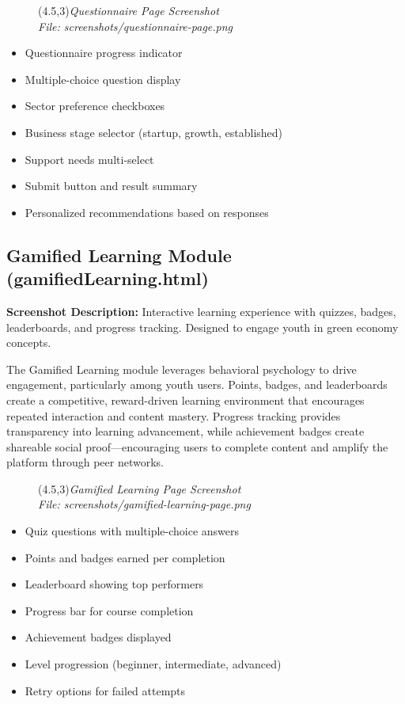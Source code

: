 \documentclass[a4paper,12pt]{article}
\begin{document}
\begin{figure}[h]
    \centering
    \framebox(4.5,3){\textit{Questionnaire Page Screenshot}}\\
    \small\textit{File: screenshots/questionnaire-page.png}
\end{figure}

\begin{itemize}
    \item Questionnaire progress indicator
    \item Multiple-choice question display
    \item Sector preference checkboxes
    \item Business stage selector (startup, growth, established)
    \item Support needs multi-select
    \item Submit button and result summary
    \item Personalized recommendations based on responses
\end{itemize}

\subsection{Gamified Learning Module (gamifiedLearning.html)}
\textbf{Screenshot Description:} Interactive learning experience with quizzes, badges, leaderboards, and progress tracking. Designed to engage youth in green economy concepts.

The Gamified Learning module leverages behavioral psychology to drive engagement, particularly among youth users. Points, badges, and leaderboards create a competitive, reward-driven learning environment that encourages repeated interaction and content mastery. Progress tracking provides transparency into learning advancement, while achievement badges create shareable social proof—encouraging users to complete content and amplify the platform through peer networks.

\begin{figure}[h]
    \centering
    \framebox(4.5,3){\textit{Gamified Learning Page Screenshot}}\\
    \small\textit{File: screenshots/gamified-learning-page.png}
\end{figure}

\begin{itemize}
    \item Quiz questions with multiple-choice answers
    \item Points and badges earned per completion
    \item Leaderboard showing top performers
    \item Progress bar for course completion
    \item Achievement badges displayed
    \item Level progression (beginner, intermediate, advanced)
    \item Retry options for failed attempts
\end{itemize}
\end{document}
